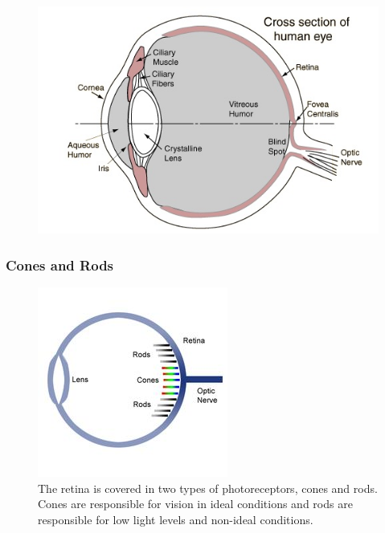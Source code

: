 \begin{frame}
	\begin{figure}
		\includegraphics[scale=.6]{assets/eye} 
		\caption{}
	\end{figure}
\end{frame}

\begin{frame}
	\frametitle{Cones and Rods}
	\begin{figure}
		\includegraphics[scale=.5]{assets/cones-rods.jpg}
		\caption{ The retina is covered in two types of photoreceptors, cones and rods. Cones are responsible for vision in ideal conditions and rods are responsible for low light levels and non-ideal conditions. }
	\end{figure}
\end{frame}

